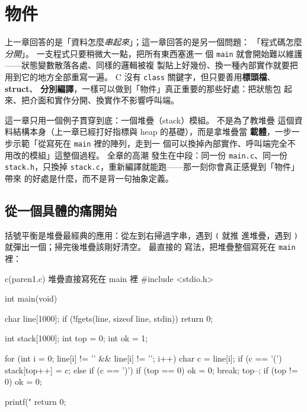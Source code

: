 \chapter{物件}
\label{ch:objects}

上一章回答的是「資料怎麼\emph{串起來}」；這一章回答的是另一個問題：
「程式碼怎麼\emph{分開}」。 一支程式只要稍微大一點，把所有東西塞進一
個 \texttt{main} 就會開始難以維護——狀態變數散落各處、同樣的邏輯被複
製貼上好幾份、換一種內部實作就要把用到它的地方全部重寫一遍。 C 沒有
\texttt{class} 關鍵字，但只要善用\textbf{標頭檔}、\textbf{struct}、
\textbf{分別編譯}，一樣可以做到「物件」真正重要的那些好處：把狀態包
起來、把介面和實作分開、換實作不影響呼叫端。

這一章只用一個例子貫穿到底：一個堆疊（stack）模組。 不是為了教堆疊
這個資料結構本身（上一章已經打好指標與 heap 的基礎），而是拿堆疊當
\textbf{載體}，一步一步示範「從寫死在 \texttt{main} 裡的陣列，走到一
個可以換掉內部實作、呼叫端完全不用改的模組」這整個過程。 全章的高潮
發生在中段：同一份 \texttt{main.c}、同一份 \texttt{stack.h}，只換掉
\texttt{stack.c}，重新編譯就能跑——那一刻你會真正感覺到「物件」帶來
的好處是什麼，而不是背一句抽象定義。

\section{從一個具體的痛開始}
\label{sec:obj-pain}

括號平衡是堆疊最經典的應用：從左到右掃過字串，遇到 \texttt{(} 就推
進堆疊，遇到 \texttt{)} 就彈出一個；掃完後堆疊該剛好清空。 最直接的
寫法，把堆疊整個寫死在 \texttt{main} 裡：

\begin{example}{c}{(paren1.c) 堆疊直接寫死在 main 裡}
#include <stdio.h>

int main(void) {
    char line[1000];
    if (!fgets(line, sizeof line, stdin)) return 0;

    int stack[1000];
    int top = 0;
    int ok = 1;

    for (int i = 0; line[i] != '\0' && line[i] != '\n'; i++) {
        char c = line[i];
        if (c == '(') {
            stack[top++] = c;
        } else if (c == ')') {
            if (top == 0) { ok = 0; break; }
            top--;
        }
    }
    if (top != 0) ok = 0;

    printf("%
    return 0;
}
\end{example}


